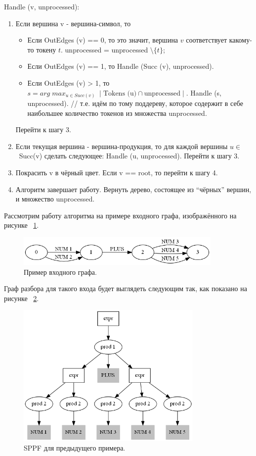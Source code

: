 Handle (v, unprocessed):
\begin{enumerate}
\item Если вершина v - вершина-символ, то 
    \begin{itemize}
        \item Если OutEdges (v) == 0, то это значит, вершина $v$ соответствует какому-то токену $t$. unprocessed = unprocessed $\setminus \{t\}$; 
        \item Если OutEdges (v) == 1, то Handle (Succ (v), unprocessed).
        \item Если OutEdges (v) > 1, то 	$s = arg \; max_{u \in Succ(v)} \; \mid \mbox{Tokens (u)} \cap \mbox{unprocessed} \mid$. Handle (s, unprocessed). // т.е. идём по тому поддереву, которое содержит в себе наибольшее количество токенов из множества unprocessed. 
    \end{itemize}
    Перейти к шагу 3.
\item Если текущая вершина - вершина-продукция, то для каждой вершины $u \in$ ~Succ(v) сделать следующее:  Handle (u, unprocessed). Перейти к шагу 3.
\item Покрасить v в чёрный цвет. Если v == root, то перейти к шагу 4.
\item Алгоритм завершает работу. Вернуть дерево, состоящее из “чёрных” вершин, и множество unprocessed. 
\end{enumerate}

Рассмотрим работу алгоритма на примере входного графа, изображённого на рисунке ~\ref{illustration_input}.

\begin{figure}[h]
\centering
\includegraphics[width=100mm]{Pictures/Illustration.png}
\caption{Пример входного графа.}
\label{illustration_input}
\end{figure}

Граф разбора для такого входа будет выглядеть следующим так, как показано на рисунке ~\ref{illustration_sppf}.

\begin{figure}[h]
\centering
\includegraphics[height=70mm]{Pictures/Illustration_sppf.png}
\caption{SPPF для предыдущего примера.}
\label{illustration_sppf}
\end{figure}

